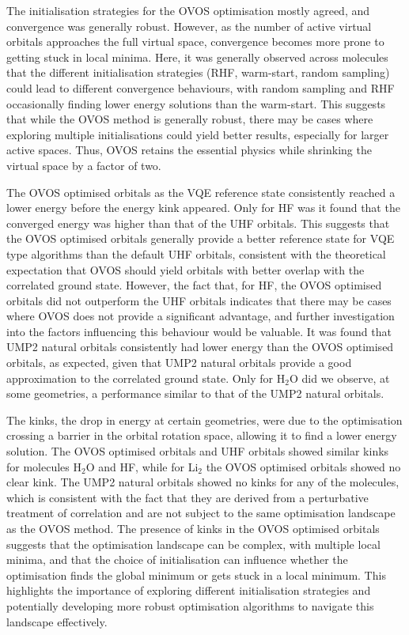 The initialisation strategies for the OVOS optimisation mostly agreed, and convergence was generally robust. However, as the number of active virtual orbitals approaches the full virtual space, convergence becomes more prone to getting stuck in local minima. Here, it was generally observed across molecules that the different initialisation strategies (RHF, warm-start, random sampling) could lead to different convergence behaviours, with random sampling and RHF occasionally finding lower energy solutions than the warm-start. This suggests that while the OVOS method is generally robust, there may be cases where exploring multiple initialisations could yield better results, especially for larger active spaces. Thus, OVOS retains the essential physics while shrinking the virtual space by a factor of two.

The OVOS optimised orbitals as the VQE reference state consistently reached a lower energy before the energy kink appeared. Only for HF was it found that the converged energy was higher than that of the UHF orbitals. This suggests that the OVOS optimised orbitals generally provide a better reference state for VQE type algorithms than the default UHF orbitals, consistent with the theoretical expectation that OVOS should yield orbitals with better overlap with the correlated ground state. However, the fact that, for HF, the OVOS optimised orbitals did not outperform the UHF orbitals indicates that there may be cases where OVOS does not provide a significant advantage, and further investigation into the factors influencing this behaviour would be valuable. It was found that UMP2 natural orbitals consistently had lower energy than the OVOS optimised orbitals, as expected, given that UMP2 natural orbitals provide a good approximation to the correlated ground state. Only for H$_2$O did we observe, at some geometries, a performance similar to that of the UMP2 natural orbitals.

The kinks, the drop in energy at certain geometries, were due to the optimisation crossing a barrier in the orbital rotation space, allowing it to find a lower energy solution. The OVOS optimised orbitals and UHF orbitals showed similar kinks for molecules H$_2$O and HF, while for Li$_2$ the OVOS optimised orbitals showed no clear kink. The UMP2 natural orbitals showed no kinks for any of the molecules, which is consistent with the fact that they are derived from a perturbative treatment of correlation and are not subject to the same optimisation landscape as the OVOS method. The presence of kinks in the OVOS optimised orbitals suggests that the optimisation landscape can be complex, with multiple local minima, and that the choice of initialisation can influence whether the optimisation finds the global minimum or gets stuck in a local minimum. This highlights the importance of exploring different initialisation strategies and potentially developing more robust optimisation algorithms to navigate this landscape effectively.

